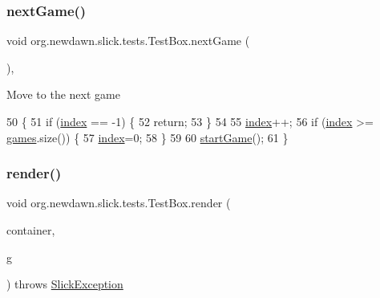 \subsubsection{\texorpdfstring{next\+Game()}{nextGame()}}
{\footnotesize\ttfamily void org.\+newdawn.\+slick.\+tests.\+Test\+Box.\+next\+Game (\begin{DoxyParamCaption}{ }\end{DoxyParamCaption})\hspace{0.3cm}{\ttfamily [inline]}, {\ttfamily [private]}}

Move to the next game 
\begin{DoxyCode}
50                             \{
51         \textcolor{keywordflow}{if} (\mbox{\hyperlink{classorg_1_1newdawn_1_1slick_1_1tests_1_1_test_box_a3421af906cc14a5746f0642cf7c1124a}{index}} == -1) \{
52             \textcolor{keywordflow}{return};
53         \}
54         
55         \mbox{\hyperlink{classorg_1_1newdawn_1_1slick_1_1tests_1_1_test_box_a3421af906cc14a5746f0642cf7c1124a}{index}}++;
56         \textcolor{keywordflow}{if} (\mbox{\hyperlink{classorg_1_1newdawn_1_1slick_1_1tests_1_1_test_box_a3421af906cc14a5746f0642cf7c1124a}{index}} >= \mbox{\hyperlink{classorg_1_1newdawn_1_1slick_1_1tests_1_1_test_box_abd3484ab8c25058d32bff289a1b032e6}{games}}.size()) \{
57             \mbox{\hyperlink{classorg_1_1newdawn_1_1slick_1_1tests_1_1_test_box_a3421af906cc14a5746f0642cf7c1124a}{index}}=0;
58         \}
59     
60         \mbox{\hyperlink{classorg_1_1newdawn_1_1slick_1_1tests_1_1_test_box_a2b2e8ec08ce37e5a97418578590279e0}{startGame}}();
61     \}
\end{DoxyCode}
\mbox{\label{classorg_1_1newdawn_1_1slick_1_1tests_1_1_test_box_ae3eeba9177511bbd8529c41fd02ffaed}} 
\subsubsection{\texorpdfstring{render()}{render()}}
{\footnotesize\ttfamily void org.\+newdawn.\+slick.\+tests.\+Test\+Box.\+render (\begin{DoxyParamCaption}\item[{\mbox{\hyperlink{classorg_1_1newdawn_1_1slick_1_1_game_container}{Game\+Container}}}]{container,  }\item[{\mbox{\hyperlink{classorg_1_1newdawn_1_1slick_1_1_graphics}{Graphics}}}]{g }\end{DoxyParamCaption}) throws \mbox{\hyperlink{classorg_1_1newdawn_1_1slick_1_1_slick_exception}{Slick\+Exception}}\hspace{0.3cm}{\ttfamily [inline]}}

